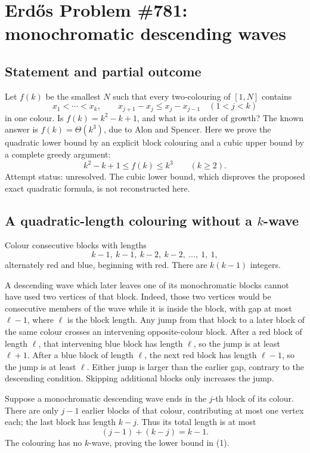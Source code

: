 \section*{Erd\H{o}s Problem \#781: monochromatic descending waves}
\subsection*{Statement and partial outcome}
Let \(f(k)\) be the smallest \(N\) such that every two-colouring of \([1,N]\) contains
\[
x_1<\cdots<x_k,\qquad
x_{j+1}-x_j\leq x_j-x_{j-1}\quad(1<j<k)
\]
in one colour. Is \(f(k)=k^2-k+1\), and what is its order of growth?
The known answer is \(f(k)=\Theta(k^3)\), due to Alon and Spencer. Here we prove the quadratic lower bound by an explicit block colouring and a cubic upper bound by a complete greedy argument:
\[
k^2-k+1\leq f(k)\leq k^3\qquad(k\geq2). \tag{1}
\]
Attempt status: unresolved. The cubic lower bound, which disproves the proposed exact quadratic formula, is not reconstructed here.

\subsection*{A quadratic-length colouring without a \(k\)-wave}
Colour consecutive blocks with lengths
\[
k-1,\ k-1,\ k-2,\ k-2,\ \ldots,\ 1,\ 1,
\]
alternately red and blue, beginning with red. There are \(k(k-1)\) integers.

A descending wave which later leaves one of its monochromatic blocks cannot have used two vertices of that block. Indeed, those two vertices would be consecutive members of the wave while it is inside the block, with gap at most \(\ell-1\), where \(\ell\) is the block length. Any jump from that block to a later block of the same colour crosses an intervening opposite-colour block. After a red block of length \(\ell\), that intervening blue block has length \(\ell\), so the jump is at least \(\ell+1\). After a blue block of length \(\ell\), the next red block has length \(\ell-1\), so the jump is at least \(\ell\). Either jump is larger than the earlier gap, contrary to the descending condition. Skipping additional blocks only increases the jump.

Suppose a monochromatic descending wave ends in the \(j\)-th block of its colour. There are only \(j-1\) earlier blocks of that colour, contributing at most one vertex each; the last block has length \(k-j\). Thus its total length is at most
\[
(j-1)+(k-j)=k-1.
\]
The colouring has no \(k\)-wave, proving the lower bound in (1).


